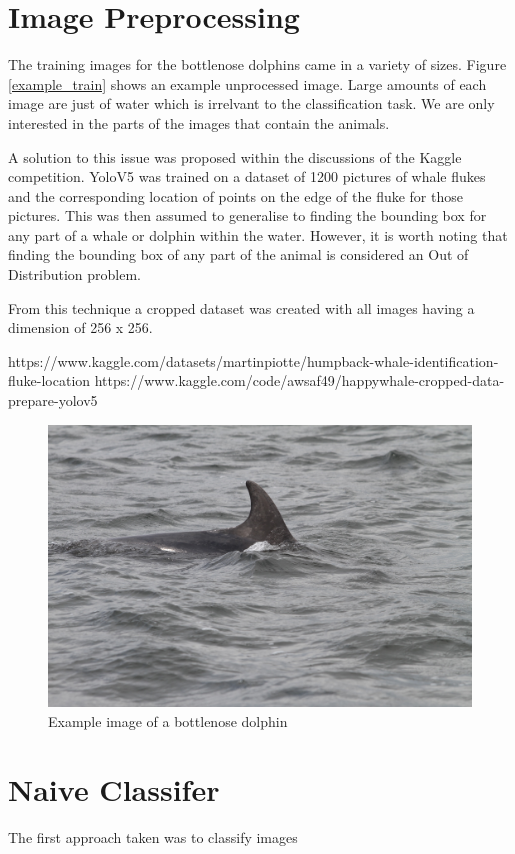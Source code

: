 \documentclass{article}
\begin{document}
\section{Image Preprocessing}

The training images for the bottlenose dolphins came in a variety of sizes. Figure \ref{example_train} shows an example unprocessed image. Large amounts of each image are just of water which is irrelvant to the classification task. We are only interested in the parts of the 
images that contain the animals.

A solution to this issue was proposed within the discussions of the Kaggle competition. YoloV5 was trained on a dataset of 1200 pictures of whale flukes and the corresponding location of points on the edge of the fluke for those pictures. 
This was then assumed to generalise to finding the bounding box for any part of a whale or dolphin within the water. However, it is worth noting that finding the bounding box of any part of the animal is considered an Out of Distribution problem. 

From this technique a cropped dataset was created with all images having a dimension of 256 x 256. 


https://www.kaggle.com/datasets/martinpiotte/humpback-whale-identification-fluke-location
https://www.kaggle.com/code/awsaf49/happywhale-cropped-data-prepare-yolov5





\begin{figure}
    \includegraphics[width=\linewidth]{example_train.jpg}
    \caption{Example image of a bottlenose dolphin}
    \label{fig:example_train}
\end{figure}


\section{Naive Classifer}

The first approach taken was to classify images
\end{document}
